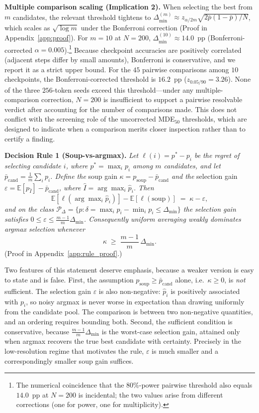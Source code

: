 \documentclass[pdflatex,sn-mathphys-ay,oneside]{sn-jnl}
\theoremstyle{thmstylethree}
\begin{document}
\noindent\textbf{Multiple comparison scaling (Implication 2).} When selecting the best from $m$ candidates, the relevant threshold tightens to $\Delta_{\min}^{(m)} \approx z_{\alpha/2m}\sqrt{2\bar{p}(1-\bar{p})/N}$, which scales as $\sqrt{\log m}$ under the Bonferroni correction (Proof in Appendix~\ref{app:proof}). For $m=10$ at $N=200$, $\Delta_{\min}^{(10)}\approx 14.0$~pp (Bonferroni-corrected $\alpha=0.005$).\footnote{The numerical coincidence that the $80\%$-power pairwise threshold also equals $14.0$~pp at $N=200$ is incidental; the two values arise from different corrections (one for power, one for multiplicity).} Because checkpoint accuracies are positively correlated (adjacent steps differ by small amounts), Bonferroni is conservative, and we report it as a strict upper bound. For the $45$ pairwise comparisons among $10$ checkpoints, the Bonferroni-corrected threshold is $16.2$~pp ($z_{0.05/90}=3.26$). None of the three $256$-token seeds exceed this threshold---under any multiple-comparison correction, $N=200$ is insufficient to support a pairwise resolvable verdict after accounting for the number of comparisons made. This does not conflict with the screening role of the uncorrected MDE$_{50}$ thresholds, which are designed to indicate when a comparison merits closer inspection rather than to certify a finding.

\textbf{Decision Rule 1 (Soup-vs-argmax).} \emph{Let $\ell(i) = p^* - p_i$ be the regret of selecting candidate $i$, where $p^* = \max_i p_i$ among $m$ candidates, and let $\bar p_{\mathrm{cand}} = \frac{1}{m}\sum_i p_i$. Define the} soup gain \emph{$\kappa = p_{\mathrm{soup}} - \bar p_{\mathrm{cand}}$ and the} selection gain \emph{$\varepsilon = \mathbb{E}[p_{\hat I}] - \bar p_{\mathrm{cand}}$, where $\hat I = \arg\max_i \hat p_i$. Then}
\[
\mathbb{E}[\ell(\arg\max\nolimits_i \hat p_i)] - \mathbb{E}[\ell(\mathrm{soup})] \;=\; \kappa - \varepsilon ,
\]
\emph{and on the class $\mathcal{P}_\Delta = \{p : \delta = \max_i p_i - \min_i p_i \leq \Delta_{\min}\}$ the selection gain satisfies $0 \leq \varepsilon \leq \frac{m-1}{m}\Delta_{\min}$. Consequently uniform averaging weakly dominates argmax selection whenever}
\[
\kappa \;\geq\; \frac{m-1}{m}\,\Delta_{\min}.
\]
\noindent (Proof in Appendix~\ref{app:rule_proof}.)

Two features of this statement deserve emphasis, because a weaker version is easy to state and is false. First, the assumption $p_{\mathrm{soup}} \geq \bar p_{\mathrm{cand}}$ alone, i.e.\ $\kappa \geq 0$, is \emph{not} sufficient. The selection gain $\varepsilon$ is also non-negative: $\hat p_i$ is positively associated with $p_i$, so noisy argmax is never worse in expectation than drawing uniformly from the candidate pool. The comparison is between two non-negative quantities, and an ordering requires bounding both. Second, the sufficient condition is conservative, because $\frac{m-1}{m}\Delta_{\min}$ is the worst-case selection gain, attained only when argmax recovers the true best candidate with certainty. Precisely in the low-resolution regime that motivates the rule, $\varepsilon$ is much smaller and a correspondingly smaller soup gain suffices.
\end{document}
